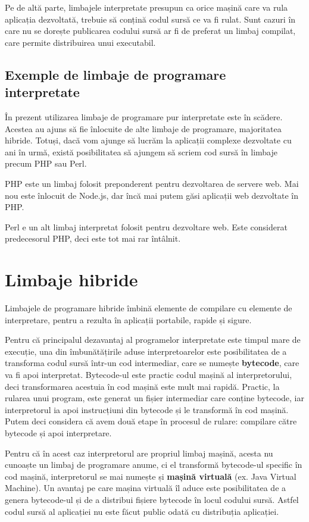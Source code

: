 Pe de altă parte, limbajele interpretate presupun ca orice mașină care va rula
aplicația dezvoltată, trebuie să conțină codul sursă ce va fi rulat. Sunt cazuri
în care nu se dorește publicarea codului sursă ar fi de preferat un limbaj
compilat, care permite distribuirea unui executabil.

\subsection{Exemple de limbaje de programare interpretate}
\label{sec:appdev:interpreted-lang:ex}

În prezent utilizarea limbaje de programare pur interpretate este în scădere.
Acestea au ajuns să fie înlocuite de alte limbaje de programare, majoritatea
hibride. Totuși, dacă vom ajunge să lucrăm la aplicații complexe dezvoltate cu
ani în urmă, există posibilitatea să ajungem să scriem cod sursă în limbaje
precum PHP sau Perl.

PHP este un limbaj folosit preponderent pentru dezvoltarea de servere web. Mai
nou este înlocuit de Node.js, dar încă mai putem găsi aplicații web dezvoltate
în PHP.

Perl e un alt limbaj interpretat folosit pentru dezvoltare web. Este considerat
predecesorul PHP, deci este tot mai rar întâlnit.

\section{Limbaje hibride}
\label{sec:appdev:hybrid-lang}

Limbajele de programare hibride îmbină elemente de compilare cu elemente de
interpretare, pentru a rezulta în aplicații portabile, rapide și sigure.

Pentru că principalul dezavantaj al programelor interpretate este timpul mare de
execuție, una din îmbunătățirile aduse interpretoarelor este posibilitatea de a
transforma codul sursă într-un cod intermediar, care se numește \textbf{bytecode}, care
va fi apoi interpretat. Bytecode-ul este practic codul mașină al
interpretorului, deci transformarea acestuia în cod mașină este mult mai rapidă.
Practic, la rularea unui program, este generat un fișier intermediar care
conține bytecode, iar interpretorul ia apoi instrucțiuni din bytecode și le
transformă în cod mașină. Putem deci considera că avem două etape în procesul de
rulare: compilare către bytecode și apoi interpretare.

Pentru că în acest caz interpretorul are propriul limbaj mașină, acesta nu cunoaște
un limbaj de programare anume, ci el transformă bytecode-ul specific în cod
mașină, interpretorul se mai numește și \textbf{mașină virtuală} (ex. Java Virtual
Machine). Un avantaj pe care mașina virtuală îl aduce este posibilitatea de a
genera bytecode-ul și de a distribui fișiere bytecode în locul codului sursă.
Astfel codul sursă al aplicației nu este făcut public odată cu distribuția
aplicației.

